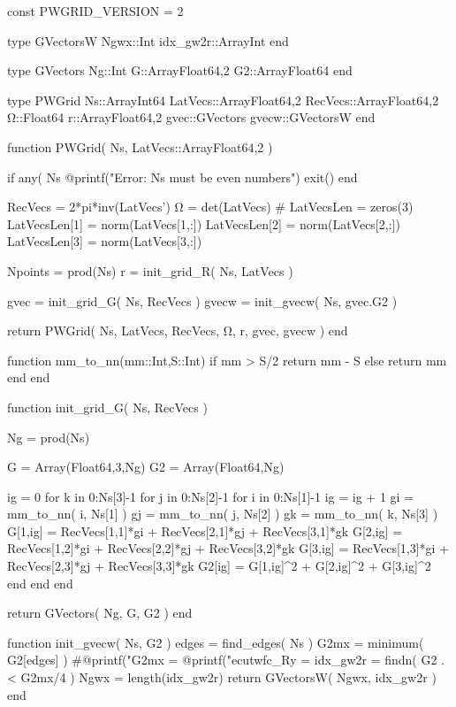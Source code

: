 
\begin{juliacode}
  const PWGRID_VERSION = 2

  type GVectorsW
    Ngwx::Int
    idx_gw2r::Array{Int}
  end

  type GVectors
    Ng::Int
    G::Array{Float64,2}
    G2::Array{Float64}
  end

  type PWGrid
    Ns::Array{Int64}
    LatVecs::Array{Float64,2}
    RecVecs::Array{Float64,2}
    Ω::Float64
    r::Array{Float64,2}
    gvec::GVectors
    gvecw::GVectorsW
  end

  function PWGrid( Ns, LatVecs::Array{Float64,2} )

    if any( Ns%
      @printf("Error: Ns must be even numbers\n")
      exit()
    end

    RecVecs = 2*pi*inv(LatVecs')
    Ω = det(LatVecs)
    #
    LatVecsLen = zeros(3)
    LatVecsLen[1] = norm(LatVecs[1,:])
    LatVecsLen[2] = norm(LatVecs[2,:])
    LatVecsLen[3] = norm(LatVecs[3,:])

    Npoints = prod(Ns)
    r = init_grid_R( Ns, LatVecs )

    gvec = init_grid_G( Ns, RecVecs )
    gvecw = init_gvecw( Ns, gvec.G2 )

    return PWGrid( Ns, LatVecs, RecVecs, Ω, r, gvec, gvecw )
  end

  function mm_to_nn(mm::Int,S::Int)
    if mm > S/2
      return mm - S
    else
      return mm
    end
  end


  function init_grid_G( Ns, RecVecs )

    Ng = prod(Ns)

    G  = Array(Float64,3,Ng)
    G2 = Array(Float64,Ng)

    ig = 0
    for k in 0:Ns[3]-1
    for j in 0:Ns[2]-1
    for i in 0:Ns[1]-1
      ig = ig + 1
      gi = mm_to_nn( i, Ns[1] )
      gj = mm_to_nn( j, Ns[2] )
      gk = mm_to_nn( k, Ns[3] )
      G[1,ig] = RecVecs[1,1]*gi + RecVecs[2,1]*gj + RecVecs[3,1]*gk
      G[2,ig] = RecVecs[1,2]*gi + RecVecs[2,2]*gj + RecVecs[3,2]*gk
      G[3,ig] = RecVecs[1,3]*gi + RecVecs[2,3]*gj + RecVecs[3,3]*gk
      G2[ig] = G[1,ig]^2 + G[2,ig]^2 + G[3,ig]^2
    end
    end
    end

    return GVectors( Ng, G, G2 )
  end

  function init_gvecw( Ns, G2 )
    edges = find_edges( Ns )
    G2mx = minimum( G2[edges] )
    #@printf("G2mx = %
    @printf("ecutwfc_Ry = %
    idx_gw2r = findn( G2 .< G2mx/4 )
    Ngwx = length(idx_gw2r)
    return GVectorsW( Ngwx, idx_gw2r )
  end


\end{juliacode}
